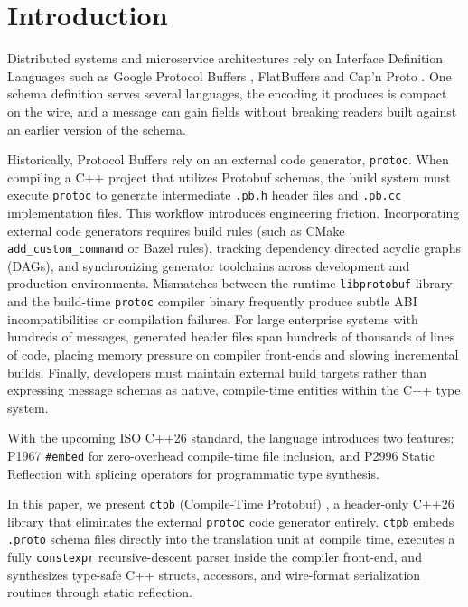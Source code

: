 \section{Introduction}
\label{sec:introduction}

Distributed systems and microservice architectures rely on Interface Definition Languages such as Google Protocol Buffers \cite{protobuf_spec}, FlatBuffers \cite{flatbuffers} and Cap'n Proto \cite{capnproto}. One schema definition serves several languages, the encoding it produces is compact on the wire, and a message can gain fields without breaking readers built against an earlier version of the schema.

Historically, Protocol Buffers rely on an external code generator, \texttt{protoc}. When compiling a C++ project that utilizes Protobuf schemas, the build system must execute \texttt{protoc} to generate intermediate \texttt{.pb.h} header files and \texttt{.pb.cc} implementation files. This workflow introduces engineering friction. Incorporating external code generators requires build rules (such as CMake \texttt{add\_custom\_command} or Bazel rules), tracking dependency directed acyclic graphs (DAGs), and synchronizing generator toolchains across development and production environments. Mismatches between the runtime \texttt{libprotobuf} library and the build-time \texttt{protoc} compiler binary frequently produce subtle ABI incompatibilities or compilation failures. For large enterprise systems with hundreds of messages, generated header files span hundreds of thousands of lines of code, placing memory pressure on compiler front-ends and slowing incremental builds. Finally, developers must maintain external build targets rather than expressing message schemas as native, compile-time entities within the C++ type system.

With the upcoming ISO C++26 standard, the language introduces two features: P1967 \texttt{\#embed} \cite{p1967} for zero-overhead compile-time file inclusion, and P2996 Static Reflection \cite{p2996} with splicing operators for programmatic type synthesis. 

In this paper, we present \texttt{ctpb} (Compile-Time Protobuf) \cite{ctpb2026}, a header-only C++26 library that eliminates the external \texttt{protoc} code generator entirely. \texttt{ctpb} embeds \texttt{.proto} schema files directly into the translation unit at compile time, executes a fully \texttt{constexpr} recursive-descent parser inside the compiler front-end, and synthesizes type-safe C++ structs, accessors, and wire-format serialization routines through static reflection.

